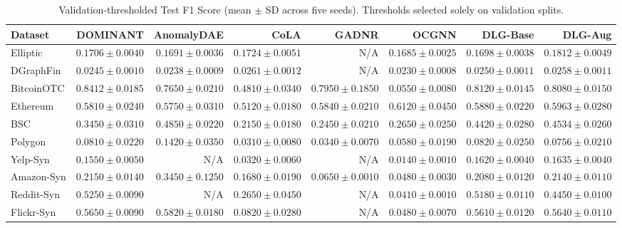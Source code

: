 \documentclass[11pt,a4paper]{article}
\begin{document}
\begin{table}[H]
\centering\fontsize{7.2pt}{8.5pt}\selectfont\setlength{\tabcolsep}{1.2pt}
\caption{Validation-thresholded Test F1 Score (mean $\pm$ SD across five seeds). Thresholds selected solely on validation splits.}
\label{tab:app_f1_full}
\begin{tabular*}{\textwidth}{@{\extracolsep{\fill}}lrrrrrrr}\toprule
\textbf{Dataset} & \textbf{DOMINANT} & \textbf{AnomalyDAE} & \textbf{CoLA} & \textbf{GADNR} & \textbf{OCGNN} & \textbf{DLG-Base} & \textbf{DLG-Aug} \\\midrule
Elliptic & $0.1706 \pm 0.0040$ & $0.1691 \pm 0.0036$ & $0.1724 \pm 0.0051$ & N/A & $0.1685 \pm 0.0025$ & $0.1698 \pm 0.0038$ & $\mathbf{0.1812 \pm 0.0049}$ \\
DGraphFin & $0.0245 \pm 0.0010$ & $0.0238 \pm 0.0009$ & $\mathbf{0.0261 \pm 0.0012}$ & N/A & $0.0230 \pm 0.0008$ & $0.0250 \pm 0.0011$ & $0.0258 \pm 0.0011$ \\
BitcoinOTC & $\mathbf{0.8412 \pm 0.0185}$ & $0.7650 \pm 0.0210$ & $0.4810 \pm 0.0340$ & $0.7950 \pm 0.1850$ & $0.0550 \pm 0.0080$ & $0.8120 \pm 0.0145$ & $0.8080 \pm 0.0150$ \\
Ethereum & $0.5810 \pm 0.0240$ & $0.5750 \pm 0.0310$ & $0.5120 \pm 0.0180$ & $0.5840 \pm 0.0210$ & $\mathbf{0.6120 \pm 0.0450}$ & $0.5880 \pm 0.0220$ & $0.5963 \pm 0.0280$ \\
BSC & $0.3450 \pm 0.0310$ & $\mathbf{0.4850 \pm 0.0220}$ & $0.2150 \pm 0.0180$ & $0.2450 \pm 0.0210$ & $0.2650 \pm 0.0250$ & $0.4420 \pm 0.0280$ & $0.4534 \pm 0.0260$ \\
Polygon & $0.0810 \pm 0.0220$ & $\mathbf{0.1420 \pm 0.0350}$ & $0.0310 \pm 0.0080$ & $0.0340 \pm 0.0070$ & $0.0580 \pm 0.0190$ & $0.0820 \pm 0.0250$ & $0.0756 \pm 0.0210$ \\
Yelp-Syn & $0.1550 \pm 0.0050$ & N/A & $0.0320 \pm 0.0060$ & N/A & $0.0140 \pm 0.0010$ & $0.1620 \pm 0.0040$ & $\mathbf{0.1635 \pm 0.0040}$ \\
Amazon-Syn & $0.2150 \pm 0.0140$ & $\mathbf{0.3450 \pm 0.1250}$ & $0.1680 \pm 0.0190$ & $0.0650 \pm 0.0010$ & $0.0480 \pm 0.0030$ & $0.2080 \pm 0.0120$ & $0.2140 \pm 0.0110$ \\
Reddit-Syn & $\mathbf{0.5250 \pm 0.0090}$ & N/A & $0.2650 \pm 0.0450$ & N/A & $0.0410 \pm 0.0010$ & $0.5180 \pm 0.0110$ & $0.4450 \pm 0.0100$ \\
Flickr-Syn & $0.5650 \pm 0.0090$ & $\mathbf{0.5820 \pm 0.0180}$ & $0.0820 \pm 0.0280$ & N/A & $0.0480 \pm 0.0070$ & $0.5610 \pm 0.0120$ & $0.5640 \pm 0.0110$ \\

\end{tabular*}
\end{table}
\end{document}
